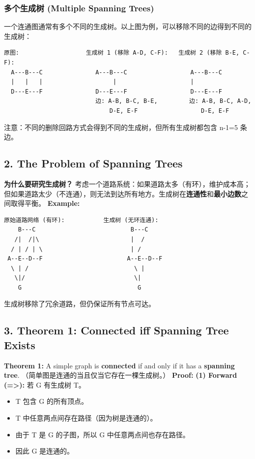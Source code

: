 \documentclass[10pt,a4paper,openany]{ctexbook}
\theoremstyle{definition}
\theoremstyle{remark}
\renewenvironment{quote}
  {\list{}{\leftmargin=1em\rightmargin=0pt\topsep=0.5pt\partopsep=0pt}\item[]}
  {\endlist}
\begin{document}
\subsubsection{多个生成树 (Multiple Spanning Trees)}

一个连通图通常有多个不同的生成树。以上图为例，可以移除不同的边得到不同的生成树：
{\footnotesize\begin{verbatim}
原图:                   生成树 1 (移除 A-D, C-F):   生成树 2 (移除 B-E, C-F):
  A---B---C               A---B---C                  A---B---C
  |   |   |                    |                     |
  D---E---F               D---E---F                  D---E---F
                          边: A-B, B-C, B-E,         边: A-B, B-C, A-D,
                              D-E, E-F                  D-E, E-F
\end{verbatim}}

\begin{quote}
注意：不同的删除回路方式会得到不同的生成树，但所有生成树都包含 n-1=5 条边。

\end{quote}
\vspace{-2pt}

\subsection{2. The Problem of Spanning Trees}

\textbf{为什么要研究生成树？}
考虑一个道路系统：如果道路太多（有环），维护成本高；但如果道路太少（不连通），则无法到达所有地方。生成树在\textbf{连通性}和\textbf{最小边数}之间取得平衡。
\textbf{Example:}
{\footnotesize\begin{verbatim}
原始道路网络 (有环):           生成树 (无环连通):
    B---C                           B---C
   /|  /|\                          |  /
  / | / | \                         | /
 A--E--D--F                        A--E--D--F
  \ | /                              \ |
   \|/                               \|
    G                                 G
\end{verbatim}}

生成树移除了冗余道路，但仍保证所有节点可达。
\vspace{-2pt}

\subsection{3. Theorem 1: Connected iff Spanning Tree Exists}

\textbf{Theorem 1:} A simple graph is \textbf{connected} if and only if it has a \textbf{spanning tree}.
（简单图是连通的当且仅当它存在一棵生成树。）
\textbf{Proof:}
\textbf{(1) Forward (=>):} 若 G 有生成树 T。
\begin{itemize}
\item T 包含 G 的所有顶点。
\item T 中任意两点间存在路径（因为树是连通的）。
\item 由于 T 是 G 的子图，所以 G 中任意两点间也存在路径。
\item 因此 G 是连通的。

\end{itemize}
\end{document}
